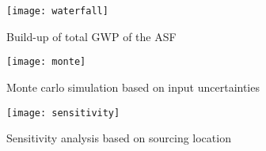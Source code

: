 
\begin{figure}[H]
\begin{center}
\texttt{[image: waterfall]}
\caption{Build-up of total GWP of the ASF}
\label{waterfall}
\end{center}
\end{figure}

\begin{figure}[H]
\begin{center}
\texttt{[image: monte]}
\caption{Monte carlo simulation based on input uncertainties}
\label{monte}
\end{center}
\end{figure}

\begin{figure}[H]
\begin{center}
\texttt{[image: sensitivity]}
\caption{Sensitivity analysis based on sourcing location}
\label{sensitivity}
\end{center}
\end{figure}

